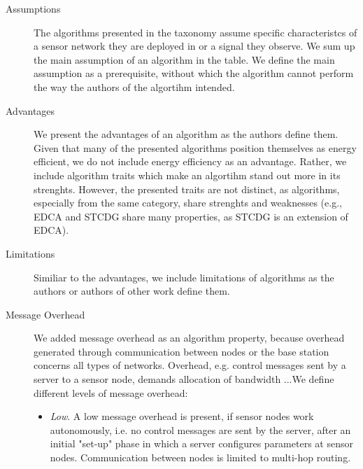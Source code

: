 \begin{description}
    \item[Assumptions]
        The algorithms presented in the taxonomy assume specific characteristcs
        of a sensor network they are deployed in or a signal they observe. We
        sum up the main assumption of an algorithm in the table. We define the
        main assumption as a prerequisite, without which the algorithm cannot
        perform the way the authors of the algortihm intended.
    \item[Advantages]
        We present the advantages of an algorithm as the authors define them.
        Given that many of the presented algorithms position themselves as
        energy efficient, we do not include energy efficiency as an advantage.
        Rather, we include algorithm traits which make an algortihm stand out
        more in its strenghts. However, the presented traits are not distinct,
        as algorithms, especially from the same category, share strenghts and
        weaknesses (e.g., \ac{EDCA} and \ac{STCDG} share many properties, as
        \ac{STCDG} is an extension of \ac{EDCA}).
    \item[Limitations]
        Similiar to the advantages, we include limitations of algorithms as the
        authors or authors of other work define them. 
        
    \item[Message Overhead]
        We added message overhead as an algorithm property, because overhead
        generated through communication between nodes or the base station
        concerns all types of networks. Overhead, e.g. control messages sent by
        a server to a sensor node, demands allocation of bandwidth ...We define
        different levels of message overhead:


        \begin{itemize}
            \item \textit{Low}. A low message overhead is present, if
            sensor nodes work autonomously, i.e. no control messages are sent
            by the server, after an initial "set-up" phase in which a server
            configures parameters at sensor nodes. Communication between nodes
            is limited to multi-hop routing.


\end{itemize}
\end{description}

